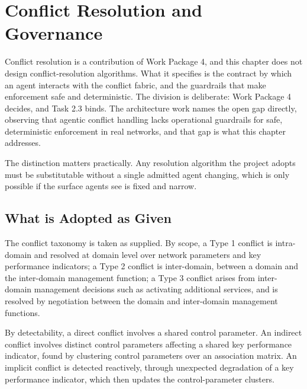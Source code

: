 
\hypertarget{conflict-resolution-and-governance}{%
\section{Conflict Resolution and Governance}\label{conflict-resolution-and-governance}}

Conflict resolution is a contribution of Work Package 4, and this
chapter does not design conflict-resolution algorithms. What it
specifies is the contract by which an agent interacts with the conflict
fabric, and the guardrails that make enforcement safe and deterministic.
The division is deliberate: Work Package 4 decides, and Task 2.3 binds.
The architecture work names the open gap directly, observing that
agentic conflict handling lacks operational guardrails for safe,
deterministic enforcement in real networks, and that gap is what this
chapter addresses.

The distinction matters practically. Any resolution algorithm the
project adopts must be substitutable without a single admitted agent
changing, which is only possible if the surface agents see is fixed and
narrow.

\hypertarget{what-is-adopted-as-given}{%
\subsection{What is Adopted as Given}\label{what-is-adopted-as-given}}

The conflict taxonomy is taken as supplied. By scope, a Type 1 conflict
is intra-domain and resolved at domain level over network parameters and
key performance indicators; a Type 2 conflict is inter-domain, between a
domain and the inter-domain management function; a Type 3 conflict
arises from inter-domain management decisions such as activating
additional services, and is resolved by negotiation between the domain
and inter-domain management functions.

By detectability, a direct conflict involves a shared control parameter.
An indirect conflict involves distinct control parameters affecting a
shared key performance indicator, found by clustering control parameters
over an association matrix. An implicit conflict is detected reactively,
through unexpected degradation of a key performance indicator, which
then updates the control-parameter clusters.


